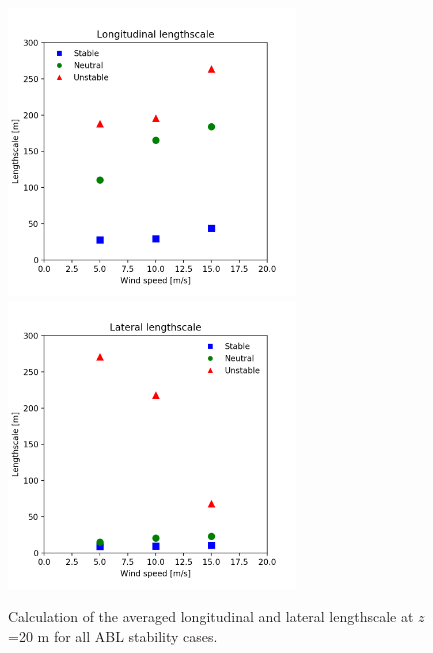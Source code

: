\begin{figure}[hbt!]
  \centering
  \includegraphics[width=3in]{figures/AllStability_Rij_LongitudinalLengthscale.png}
  \includegraphics[width=3in]{figures/AllStability_Rij_LateralLengthscale.png}
  \caption{ \label{fig:AllStabilityLengthscale} Calculation of the
    averaged longitudinal and lateral lengthscale at $z$=20 m for all
    ABL stability cases.}
\end{figure}

